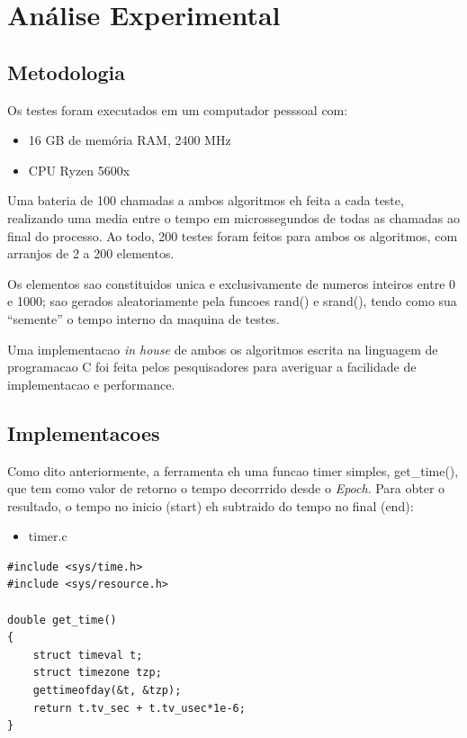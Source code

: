\documentclass{article}
\renewcommand\texttt[1]{{\ttfamily\color{GruvOrange}#1}}
\begin{document}
\section{Análise Experimental}

\subsection{Metodologia}

Os testes foram executados em um computador pesssoal com:
\begin{itemize}
  \item{16 GB de memória RAM, 2400 MHz}
  \item{CPU Ryzen 5600x}
\end{itemize}
Uma bateria de 100 chamadas a ambos algoritmos eh feita a cada teste, realizando uma media entre o tempo em microssegundos de todas as chamadas ao final do processo. Ao todo, 200 testes foram feitos para ambos os algoritmos, com arranjos de 2 a 200 elementos.

Os elementos sao constituidos unica e exclusivamente de numeros inteiros entre 0 e 1000; sao gerados aleatoriamente pela funcoes \texttt{rand()} e \texttt{srand()}, tendo como sua ``semente'' o tempo interno da maquina de testes.

Uma implementacao \textit{in house} de ambos os algoritmos escrita na linguagem de programacao \texttt{C} foi feita pelos pesquisadores para averiguar a facilidade de implementacao e performance.

\subsection{Implementacoes}

Como dito anteriormente, a ferramenta eh uma funcao timer simples, \texttt{get\_time()}, que tem como valor de retorno o tempo decorrrido desde o \textit{Epoch}. Para obter o resultado, o tempo no inicio (\texttt{start}) eh subtraido do tempo no final (\texttt{end}):

\begin{itemize}
  \item{\texttt{timer.c}}
\end{itemize}
\begin{verbatim}
#include <sys/time.h>
#include <sys/resource.h>

double get_time()
{
    struct timeval t;
    struct timezone tzp;
    gettimeofday(&t, &tzp);
    return t.tv_sec + t.tv_usec*1e-6;
}
\end{verbatim}
\end{document}
